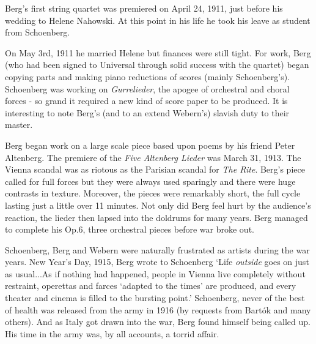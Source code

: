 Berg's first string quartet was premiered on April 24, 1911, just before his wedding to Helene Nahowski. At this point in his life he took his leave as student from Schoenberg. 

On May 3rd, 1911 he married Helene but finances were still tight. For work, Berg (who had been signed to Universal through solid success with the quartet) began copying parts and making piano reductions of scores (mainly Schoenberg's). Schoenberg was working on \textit{Gurrelieder}, the apogee of orchestral and choral forces - so grand it required a new kind of score paper to be produced. It is interesting to note Berg's (and to an extend Webern's) slavish duty to their master.  

Berg began work on a large scale piece based upon poems by his friend Peter Altenberg. The premiere of the \textit{Five Altenberg Lieder} was March 31, 1913. The Vienna scandal was as riotous as the Parisian scandal for \textit{The Rite}. Berg's piece called for full forces but they were always used sparingly and there were huge contrasts in texture. Moreover, the pieces were remarkably short, the full cycle lasting just a little over 11 minutes. Not only did Berg feel hurt by the audience's reaction, the lieder then lapsed into the doldrums for many years. Berg managed to complete his Op.6, three orchestral pieces before war broke out. 

Schoenberg, Berg and Webern were naturally frustrated as artists during the war years. New Year's Day, 1915, Berg wrote to Schoenberg `Life \textit{outside} goes on just as usual...As if nothing had happened, people in Vienna live completely without restraint, operettas and farces `adapted to the times' are produced, and every theater and cinema is filled to the bursting point.' Schoenberg, never of the best of health was released from the army in 1916 (by requests from Bart\'ok and many others). And as Italy got drawn into the war, Berg found himself being called up. His time in the army was, by all accounts, a torrid affair.  

